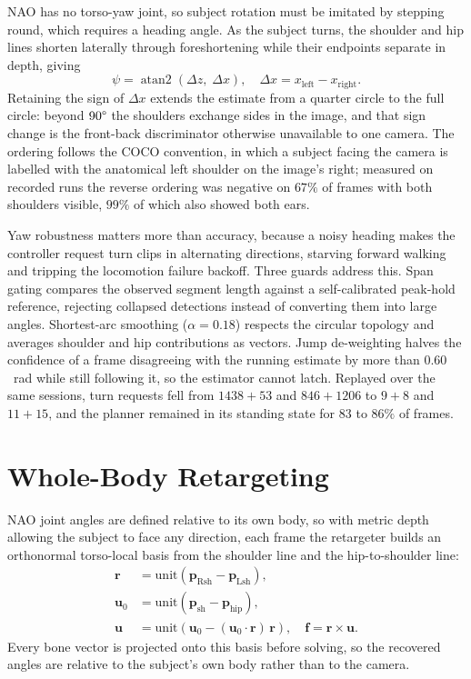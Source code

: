 \documentclass[twocolumn]{article}
\begin{document}
NAO has no torso-yaw joint, so subject rotation must be imitated by stepping round, which
requires a heading angle. As the subject turns, the shoulder and hip lines shorten laterally
through foreshortening while their endpoints separate in depth, giving
\begin{equation}
\psi = \operatorname{atan2}\!\left(\Delta z,\; \Delta x\right), \quad
\Delta x = x_{\text{left}} - x_{\text{right}}.
\label{eq:yaw}
\end{equation}
Retaining the sign of $\Delta x$ extends the estimate from a quarter circle to the full circle:
beyond $90\degree$ the shoulders exchange sides in the image, and that sign change is the
front-back discriminator otherwise unavailable to one camera. The ordering follows the COCO
convention, in which a subject facing the camera is labelled with the anatomical left shoulder
on the image's right; measured on recorded runs the reverse ordering was negative on $67\%$ of
frames with both shoulders visible, $99\%$ of which also showed both ears.

Yaw robustness matters more than accuracy, because a noisy heading makes the controller request
turn clips in alternating directions, starving forward walking and tripping the locomotion
failure backoff. Three guards address this. Span gating compares the observed segment length
against a self-calibrated peak-hold reference, rejecting collapsed detections instead of
converting them into large angles. Shortest-arc smoothing ($\alpha = 0.18$) respects the
circular topology and averages shoulder and hip contributions as vectors. Jump de-weighting
halves the confidence of a frame disagreeing with the running estimate by more than $0.60$~rad
while still following it, so the estimator cannot latch. Replayed over the same sessions, turn
requests fell from $1438{+}53$ and $846{+}1206$ to $9{+}8$ and $11{+}15$, and the planner
remained in its standing state for $83$ to $86\%$ of frames.

\section{Whole-Body Retargeting}

NAO joint angles are defined relative to its own body, so with metric depth allowing the
subject to face any direction, each frame the retargeter builds an orthonormal torso-local
basis from the shoulder line and the hip-to-shoulder line:
\begin{align}
\mathbf{r} &= \mathrm{unit}\left(\mathbf{p}_{\text{Rsh}} - \mathbf{p}_{\text{Lsh}}\right), \nonumber\\
\mathbf{u}_0 &= \mathrm{unit}\left(\mathbf{p}_{\text{sh}} - \mathbf{p}_{\text{hip}}\right), \nonumber\\
\mathbf{u} &= \mathrm{unit}\left(\mathbf{u}_0 - (\mathbf{u}_0 \cdot \mathbf{r})\,\mathbf{r}\right),
\quad \mathbf{f} = \mathbf{r} \times \mathbf{u}.
\label{eq:basis}
\end{align}
Every bone vector is projected onto this basis before solving, so the recovered angles are
relative to the subject's own body rather than to the camera.
\end{document}
